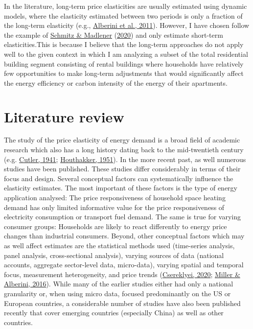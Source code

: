 \documentclass[12pt,twoside]{reedthesis}
\begin{document}
In the literature, long-term price elasticities are usually estimated using dynamic models, where the elasticity estimated between two periods is only a fraction of the long-term elasticity (e.g., \protect\hyperlink{ref-alberini_etal11}{Alberini et al., 2011}). However, I have chosen follow the example of \protect\hyperlink{ref-schmitz_madlener20}{Schmitz \& Madlener} (\protect\hyperlink{ref-schmitz_madlener20}{2020}) and only estimate short-term elasticities.This is because I believe that the long-term approaches do not apply well to the given context in which I am analyzing a subset of the total residential building segment consisting of rental buildings where households have relatively few opportunities to make long-term adjustments that would significantly affect the energy efficiency or carbon intensity of the energy of their apartments.

\hypertarget{review}{%
\section{Literature review}\label{review}}

The study of the price elasticity of energy demand is a broad field of academic research which also has a long history dating back to the mid-twentieth century (e.g. \protect\hyperlink{ref-cutler41}{Cutler, 1941}; \protect\hyperlink{ref-houthakker51}{Houthakker, 1951}). In the more recent past, as well numerous studies have been published. These studies differ considerably in terms of their focus and design. Several conceptual factors can systematically influence the elasticity estimates. The most important of these factors is the type of energy application analysed: The price responsiveness of household space heating demand has only limited informative value for the price responsiveness of electricity consumption or transport fuel demand. The same is true for varying consumer groups: Households are likely to react differently to energy price changes than industrial consumers. Beyond, other conceptual factors which may as well affect estimates are the statistical methods used (time-series analysis, panel analysis, cross-sectional analysis), varying sources of data (national accounts, aggregate sector-level data, micro-data), varying spatial and temporal focus, measurement heterogeneity, and price trends (\protect\hyperlink{ref-csereklyei20}{Csereklyei, 2020}; \protect\hyperlink{ref-miller_alberini16}{Miller \& Alberini, 2016}). While many of the earlier studies either had only a national granularity or, when using micro data, focused predominantly on the US or European countries, a considerable number of studies have also been published recently that cover emerging countries (especially China) as well as other countries.
\end{document}
